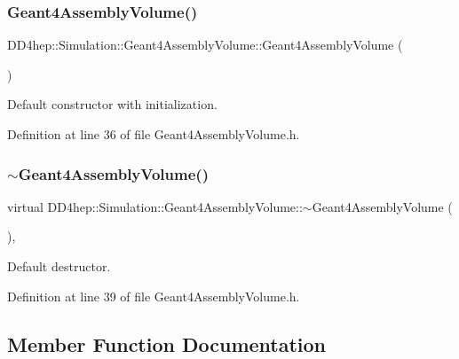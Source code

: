 \subsubsection{\texorpdfstring{Geant4\+Assembly\+Volume()}{Geant4AssemblyVolume()}}
{\footnotesize\ttfamily D\+D4hep\+::\+Simulation\+::\+Geant4\+Assembly\+Volume\+::\+Geant4\+Assembly\+Volume (\begin{DoxyParamCaption}{ }\end{DoxyParamCaption})\hspace{0.3cm}{\ttfamily [inline]}}



Default constructor with initialization. 



Definition at line 36 of file Geant4\+Assembly\+Volume.\+h.

\hypertarget{class_d_d4hep_1_1_simulation_1_1_geant4_assembly_volume_a62b2a9ebf445a8482edbe01918d55243}{}\label{class_d_d4hep_1_1_simulation_1_1_geant4_assembly_volume_a62b2a9ebf445a8482edbe01918d55243} 
\subsubsection{\texorpdfstring{$\sim$\+Geant4\+Assembly\+Volume()}{~Geant4AssemblyVolume()}}
{\footnotesize\ttfamily virtual D\+D4hep\+::\+Simulation\+::\+Geant4\+Assembly\+Volume\+::$\sim$\+Geant4\+Assembly\+Volume (\begin{DoxyParamCaption}{ }\end{DoxyParamCaption})\hspace{0.3cm}{\ttfamily [inline]}, {\ttfamily [virtual]}}



Default destructor. 



Definition at line 39 of file Geant4\+Assembly\+Volume.\+h.



\subsection{Member Function Documentation}
\hypertarget{class_d_d4hep_1_1_simulation_1_1_geant4_assembly_volume_a5f445612042e1ff7a273e1c2fdb5111b}{}\label{class_d_d4hep_1_1_simulation_1_1_geant4_assembly_volume_a5f445612042e1ff7a273e1c2fdb5111b} 
